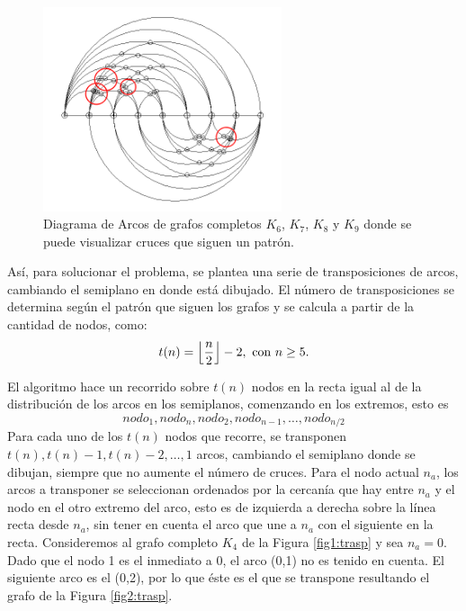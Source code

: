 \begin{figure}
		\includegraphics[width=7cm]{imagenes/grafo_4_bn_no_opt.png}
		\caption{Diagrama de Arcos de grafos completos $K_6$, $K_7$, $K_8$ y $K_9$ donde se puede visualizar cruces que siguen un patrón.}
		\label{fig:arcdiagram_no_optimo}
	\end{figure}
	
	
	Así, para solucionar el problema, se plantea una serie de transposiciones de arcos, cambiando el semiplano en donde está dibujado. El  número de transposiciones se determina según el patrón que siguen los grafos y  se calcula a partir de la cantidad de nodos, como:	$$t(n) = \floor*{\frac{n}{2}}-2,\ \mbox{con } n\geq 5.$$
	
	El algoritmo hace un recorrido sobre $t(n)$ nodos en la recta igual al de la distribución de los arcos en los semiplanos, comenzando en los extremos, esto es $$nodo_1, nodo_n, nodo_2, nodo_{n-1}, \ldots, nodo_{n / 2}$$ Para cada uno de los $t(n)$ nodos que recorre, se transponen $t(n), t(n)-1, t(n)-2, \ldots, 1$ arcos,  cambiando el  semiplano donde se dibujan, siempre que no aumente el número de cruces. Para el nodo actual $n_a$, los arcos a transponer se seleccionan ordenados por la cercanía que hay entre  $n_a$ y el nodo en el otro extremo del arco, esto es de izquierda a derecha sobre la línea recta desde $n_a$,  sin tener en cuenta el  arco que une a  $n_a$ con el siguiente en la recta. Consideremos al grafo completo $K_4$ de la Figura \ref{fig1:trasp} y sea $n_a=0$. Dado que el nodo 1 es el inmediato a 0, el arco (0,1) no es tenido en cuenta. El siguiente arco es el (0,2), por lo que éste es el que se transpone resultando el grafo  de la Figura \ref{fig2:trasp}.


